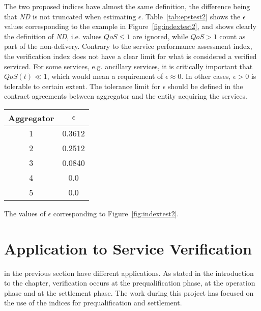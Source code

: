 The two proposed indices have almost the same definition, the difference being that \emph{ND} is not truncated when estimating $\epsilon$. Table~\ref{tab:epstest2} shows the $\epsilon$ values corresponding to the example in Figure~\ref{fig:indextest2}, and shows clearly the definition of \emph{ND}, i.e. values $QoS \leq 1$ are ignored, while $QoS > 1$ count as part of the non-delivery. Contrary to the service performance assessment index, the verification index does not have a clear limit for what is considered a verified serviced. For some services, e.g. ancillary services, it is critically important that $QoS(t) \ll 1$, which would mean a requirement of $\epsilon \approx 0$. In other cases, $\epsilon > 0$ is tolerable to certain extent. The tolerance limit for $\epsilon$ should be defined in the contract agreements between aggregator and the entity acquiring the services.

\begin{margintable}[-5\baselineskip]%
	\centering
	\begin{tabular}{cc}
		\toprule
		Aggregator & $\epsilon$ \\
		\midrule
		1 & 0.3612 \\
		2 & 0.2512  \\
		3 & 0.0840  \\
		4 & 0.0  \\
		5 & 0.0 \\
		\bottomrule
	\end{tabular}
	\caption{The values of $\epsilon$ corresponding to Figure~\ref{fig:indextest2}.}
	\label{tab:epstest2}
\end{margintable}


\section{Application to Service Verification}
 in the previous section have different applications. As stated in the introduction to the chapter, verification occurs at the prequalification phase, at the operation phase and at the settlement phase. The work during this project has focused on the use of the indices for prequalification and settlement. 

